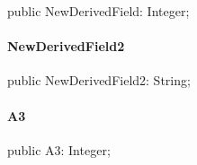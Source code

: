 \documentclass{report}
\begin{document}
\begin{list}{}{
\setlength{\itemindent}{0cm}
\setlength{\listparindent}{0cm}
\setlength{\leftmargin}{\evensidemargin}
\addtolength{\leftmargin}{\tmplength}
\settowidth{\labelsep}{X}
\addtolength{\leftmargin}{\labelsep}
\setlength{\labelwidth}{\tmplength}
}
\begin{flushleft}
\item[\textbf{Declaration}\hfill]
\begin{ttfamily}
public NewDerivedField: Integer;\end{ttfamily}


\end{flushleft}
\end{list}
\paragraph*{NewDerivedField2}\hspace*{\fill}

\begin{list}{}{
\setlength{\itemindent}{0cm}
\setlength{\listparindent}{0cm}
\setlength{\leftmargin}{\evensidemargin}
\addtolength{\leftmargin}{\tmplength}
\settowidth{\labelsep}{X}
\addtolength{\leftmargin}{\labelsep}
\setlength{\labelwidth}{\tmplength}
}
\begin{flushleft}
\item[\textbf{Declaration}\hfill]
\begin{ttfamily}
public NewDerivedField2: String;\end{ttfamily}


\end{flushleft}
\end{list}
\paragraph*{A3}\hspace*{\fill}

\begin{list}{}{
\setlength{\itemindent}{0cm}
\setlength{\listparindent}{0cm}
\setlength{\leftmargin}{\evensidemargin}
\addtolength{\leftmargin}{\tmplength}
\settowidth{\labelsep}{X}
\addtolength{\leftmargin}{\labelsep}
\setlength{\labelwidth}{\tmplength}
}
\begin{flushleft}
\item[\textbf{Declaration}\hfill]
\begin{ttfamily}
public A3: Integer;\end{ttfamily}


\end{flushleft}
\end{list}
\end{document}
